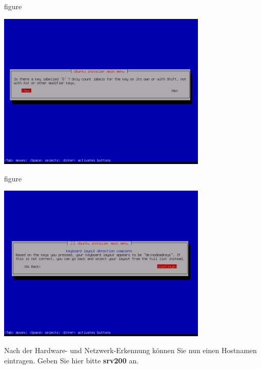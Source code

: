 \begin{nofloat}{figure}
\begin{center}
\includegraphics[width=0.75\textwidth]{screenshots/08_ubuntu_install.png}
\end{center}
\end{nofloat}

\begin{nofloat}{figure}
\begin{center}
\includegraphics[width=0.75\textwidth]{screenshots/09_ubuntu_install.png}
\end{center}
\end{nofloat}

Nach der Hardware- und Netzwerk-Erkennung können Sie nun einen Hostnamen
eintragen. Geben Sie hier bitte \textbf{srv200} an.

